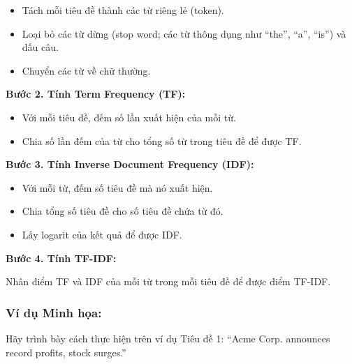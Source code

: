 \begin{itemize}
  \item Tách mỗi tiêu đề thành các từ riêng lẻ (token).
  \item Loại bỏ các từ dừng (stop word; các từ thông dụng như ``the'', ``a'', ``is'') và dấu câu.
  \item Chuyển các từ về chữ thường.
\end{itemize}

\textbf{Bước 2. Tính Term Frequency (TF):}

\begin{itemize}
  \item Với mỗi tiêu đề, đếm số lần xuất hiện của mỗi từ.
  \item Chia số lần đếm của từ cho tổng số từ trong tiêu đề để được TF.
\end{itemize}

\textbf{Bước 3. Tính Inverse Document Frequency (IDF):}

\begin{itemize}
  \item Với mỗi từ, đếm số tiêu đề mà nó xuất hiện.
  \item Chia tổng số tiêu đề cho số tiêu đề chứa từ đó.
  \item Lấy logarit của kết quả để được IDF.
\end{itemize}

\textbf{Bước 4. Tính TF-IDF:}

Nhân điểm TF và IDF của mỗi từ trong mỗi tiêu đề để được điểm TF-IDF.

\subsubsection*{Ví dụ Minh họa:}

Hãy trình bày cách thực hiện trên ví dụ Tiêu đề 1: ``Acme Corp. announces record profits, stock surges.''

